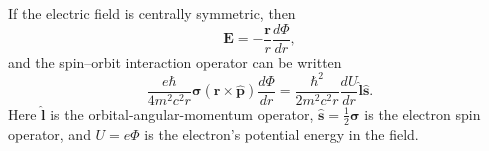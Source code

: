 If the electric field is centrally symmetric, then
\[
\mathbf E=-\frac{\mathbf r}{r}\frac{d\Phi}{dr},
\]
and the spin--orbit interaction operator can be written
\begin{equation}
\frac{e\hbar}{4m^2c^2r}\boldsymbol{\sigma}(\mathbf r\times\widehat{\mathbf p})
\frac{d\Phi}{dr}
=\frac{\hbar^2}{2m^2c^2r}\frac{dU}{dr}\widehat{\mathbf l}\widehat{\mathbf s}.
\tag{33.13}
\end{equation}
Here $\widehat{\mathbf l}$ is the orbital-angular-momentum operator, $\widehat{\mathbf s}=\tfrac12\boldsymbol{\sigma}$ is the electron spin operator, and $U=e\Phi$ is the electron's potential energy in the field.

